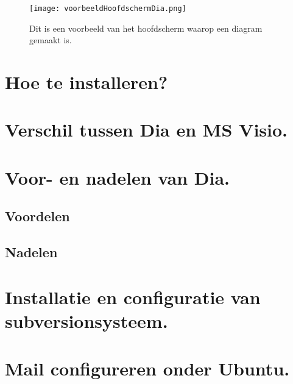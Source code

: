 \documentclass[11pt]{article}
\begin{document}
\begin{figure}[hb]
\centering
\texttt{[image: voorbeeldHoofdschermDia.png]}  
\caption [Hoofd Scherm]{Dit is een voorbeeld van het hoofdscherm waarop een diagram gemaakt is.}
\end{figure}   

\section {Hoe te installeren?}

\section {Verschil tussen Dia en MS Visio.}

\section {Voor- en nadelen van Dia.}
\subsection{Voordelen}
\subsection{Nadelen}

\section{Installatie en configuratie van subversionsysteem.}

\section{Mail configureren onder Ubuntu.}
\end{document}
